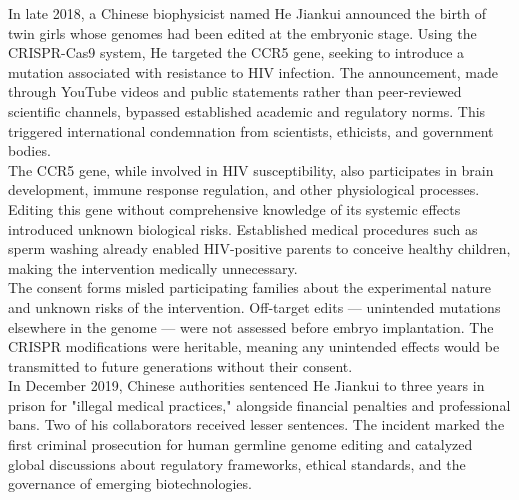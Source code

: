 \begin{shadedstory}

In late 2018, a Chinese biophysicist named He Jiankui announced the birth of twin girls whose genomes had been edited at the embryonic stage. Using the CRISPR-Cas9 system, He targeted the CCR5 gene, seeking to introduce a mutation associated with resistance to HIV infection. The announcement, made through YouTube videos and public statements rather than peer-reviewed scientific channels, bypassed established academic and regulatory norms. This triggered international condemnation from scientists, ethicists, and government bodies.\\

The CCR5 gene, while involved in HIV susceptibility, also participates in brain development, immune response regulation, and other physiological processes. Editing this gene without comprehensive knowledge of its systemic effects introduced unknown biological risks. Established medical procedures such as sperm washing already enabled HIV-positive parents to conceive healthy children, making the intervention medically unnecessary.\\

 The consent forms misled participating families about the experimental nature and unknown risks of the intervention. Off-target edits — unintended mutations elsewhere in the genome — were not assessed before embryo implantation. The CRISPR modifications were heritable, meaning any unintended effects would be transmitted to future generations without their consent.\\

In December 2019, Chinese authorities sentenced He Jiankui to three years in prison for "illegal medical practices," alongside financial penalties and professional bans. Two of his collaborators received lesser sentences. The incident marked the first criminal prosecution for human germline genome editing and catalyzed global discussions about regulatory frameworks, ethical standards, and the governance of emerging biotechnologies.\\

\end{shadedstory}

